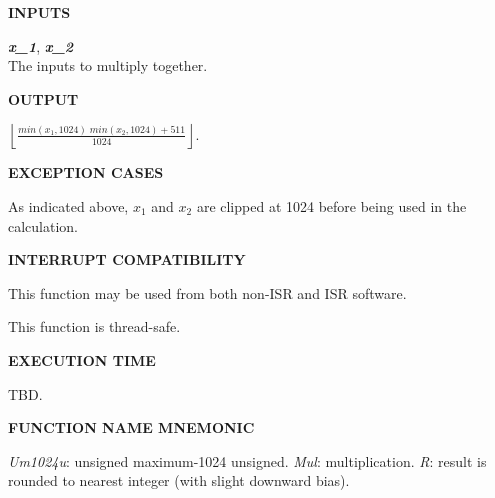 \noindent\textbf{INPUTS}
\begin{list}{}{\setlength{\leftmargin}{0.5in}\setlength{\itemindent}{-0.25in}\setlength{\topsep}{0.0in}\setlength{\partopsep}{0.0in}}
\item \emph{\textbf{x\_1}}, \emph{\textbf{x\_2}} \\
      The inputs to multiply together.
\end{list}
\vspace{2.8ex}

\noindent\textbf{OUTPUT}
\vspace{0.4ex}
\begin{list}{}{\setlength{\leftmargin}{0.25in}\setlength{\topsep}{0.0in}}
\item  $\displaystyle{\left\lfloor \frac{min(x_1, 1024) \; min(x_2, 1024) + 511}{1024} \right\rfloor}$.
\end{list}
\vspace{2.8ex}

\noindent\textbf{EXCEPTION CASES}
\begin{list}{}{\setlength{\leftmargin}{0.25in}\setlength{\topsep}{0.0in}}
\item As indicated above, $x_1$ and $x_2$ are clipped at 1024 before being used
      in the calculation.
\end{list}
\vspace{2.8ex}

\noindent\textbf{INTERRUPT COMPATIBILITY}
\begin{list}{}{\setlength{\leftmargin}{0.25in}\setlength{\topsep}{0.0in}}
\item This function may be used from both non-ISR and ISR software.
\item This function is thread-safe.
\end{list}
\vspace{2.8ex}

\noindent\textbf{EXECUTION TIME}
\begin{list}{}{\setlength{\leftmargin}{0.25in}\setlength{\topsep}{0.0in}}
\item TBD.
\end{list}
\vspace{2.8ex}

\noindent\textbf{FUNCTION NAME MNEMONIC}
\begin{list}{}{\setlength{\leftmargin}{0.25in}\setlength{\topsep}{0.0in}}
\item \emph{Um1024u}: unsigned maximum-1024 unsigned.
      \emph{Mul}:     multiplication.
      \emph{R}:       result is rounded to nearest integer (with slight downward bias).
\end{list}


